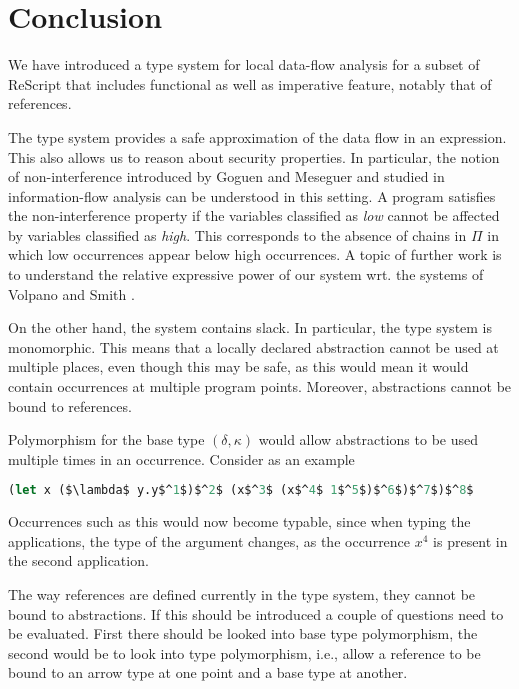 \documentclass{eptcs}
\begin{document}
\section{Conclusion}\label{sec:Conc}

We have introduced a type system for local data-flow analysis for a
subset of ReScript that includes functional as well as imperative
feature, notably that of references.

The type system provides a safe approximation of the data flow in an
expression. This also allows us to reason about security
properties. In particular, the notion of non-interference introduced
by Goguen and Meseguer \cite{goguen-meseguer} and studied in information-flow analysis can be
understood in this setting. A program satisfies the non-interference
property if the variables classified as \emph{low} cannot be affected
by variables classified as \emph{high}. This corresponds to the
absence of chains in $\Pi$ in which low occurrences appear below high
occurrences. A topic of further work is to understand the relative
expressive power of our system wrt. the systems of Volpano and Smith
\cite{volpano-smith-96,volpano-smith-97}.

On the other hand, the system contains slack. In particular, the type
system is monomorphic. This means that a locally declared abstraction
cannot be used at multiple places, even though this may be safe, as
this would mean it would contain occurrences at multiple program
points. Moreover, abstractions cannot be bound to references.

Polymorphism for the base type $(\delta,\kappa)$ would allow 
abstractions to be used multiple times in an occurrence. Consider as
an example

\begin{lstlisting}[language=Caml, mathescape=true]
(let x ($\lambda$ y.y$^1$)$^2$ (x$^3$ (x$^4$ 1$^5$)$^6$)$^7$)$^8$
\end{lstlisting}

Occurrences such as this would now become typable,
since when typing the applications, the type of the argument changes,
as the occurrence $x^4$ is present in the second application. 

The way references are defined currently in the type system, they cannot be bound to abstractions.
If this should be introduced a couple of questions need to be evaluated.
First there should be looked into base type polymorphism, the second
would be to look into type polymorphism, i.e., allow a reference to be bound to
an arrow type at one point and a base type at another.
\end{document}
